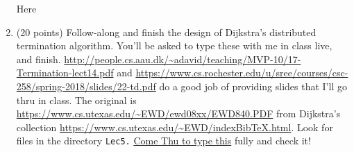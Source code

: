 \documentclass[11pt]{article}
\begin{document}
\begin{enumerate}
\begin{minipage}{\minpagw}
{{      Here
    }%
  }%
\end{minipage}

\clearpage

\item (20 points) Follow-along and finish the design of
  Dijkstra's distributed termination algorithm.
  You'll be asked to type these with me in class live, and
  finish.
  \url{http://people.cs.aau.dk/~adavid/teaching/MVP-10/17-Termination-lect14.pdf}
  and
  \url{https://www.cs.rochester.edu/u/sree/courses/csc-258/spring-2018/slides/22-td.pdf}
  do a good job of providing slides
  that I'll go thru in class.
  The original is
  \url{https://www.cs.utexas.edu/~EWD/ewd08xx/EWD840.PDF}
  from Dijkstra's collection
  \url{https://www.cs.utexas.edu/~EWD/indexBibTeX.html}.
  Look for files in the directory {\tt Lec5.}
  \underline{Come Thu to type this} fully and check it!
  

\begin{minipage}{\minpagw}
\end{minipage}

\end{enumerate}
\end{document}
